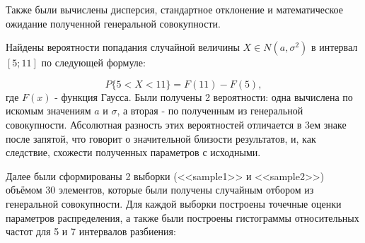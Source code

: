 Также были вычислены дисперсия, стандартное отклонение и математическое ожидание полученной генеральной совокупности.

Найдены вероятности попадания случайной величины $X \in  N(a, \sigma^2)$ в интервал $[5;11]$ по следующей формуле:

\begin{equation}
	P\{5 < X < 11\} = F(11) - F(5),
\end{equation}
где $F(x)$ - функция Гаусса. Были получены 2 вероятности: одна вычислена по искомым значениям $a$ и $\sigma$, а вторая - по полученным из генеральной совокупности. Абсолютная разность этих вероятностей отличается в 3ем знаке после запятой, что говорит о значительной близости результатов, и, как следствие, схожести полученных параметров с исходными.

Далее были сформированы 2 выборки (<<sample1>> и <<sample2>>) объёмом 30 элементов, которые были получены случайным отбором из генеральной совокупности. Для каждой выборки построены точечные оценки параметров распределения, а также были построены гистограммы относительных частот для 5 и 7 интервалов разбиения:

